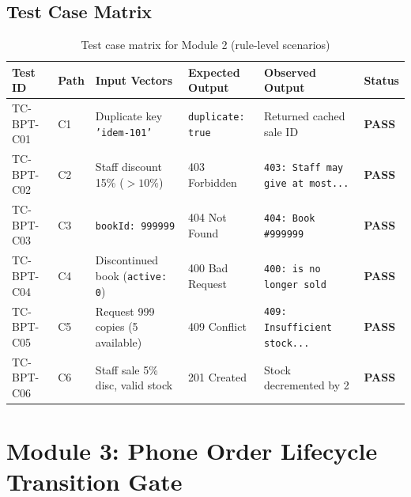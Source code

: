 \documentclass[12pt, a4paper]{report}
\begin{document}
\section{Test Case Matrix}
\begin{table}[H]
\centering
\footnotesize
\begin{tabularx}{\textwidth}{L{2.0cm} C{0.8cm} L{3.5cm} L{3.5cm} L{3.8cm} C{1.2cm}}
\toprule
\textbf{Test ID} & \textbf{Path} & \textbf{Input Vectors} & \textbf{Expected Output} & \textbf{Observed Output} & \textbf{Status} \\
\midrule
TC-BPT-C01 & C1 & Duplicate key \texttt{'idem-101'} & \texttt{duplicate: true} & Returned cached sale ID & \textbf{PASS} \\
TC-BPT-C02 & C2 & Staff discount 15\% ($>10\%$) & 403 Forbidden & \texttt{403: Staff may give at most...} & \textbf{PASS} \\
TC-BPT-C03 & C3 & \texttt{bookId: 999999} & 404 Not Found & \texttt{404: Book \#999999} & \textbf{PASS} \\
TC-BPT-C04 & C4 & Discontinued book (\texttt{active: 0}) & 400 Bad Request & \texttt{400: is no longer sold} & \textbf{PASS} \\
TC-BPT-C05 & C5 & Request 999 copies (5 available) & 409 Conflict & \texttt{409: Insufficient stock...} & \textbf{PASS} \\
TC-BPT-C06 & C6 & Staff sale 5\% disc, valid stock & 201 Created & Stock decremented by 2 & \textbf{PASS} \\
\bottomrule
\end{tabularx}
\caption{Test case matrix for Module 2 (rule-level scenarios)}
\label{tab:matrix_2}
\end{table}

\chapter{Module 3: Phone Order Lifecycle Transition Gate}
\end{document}
